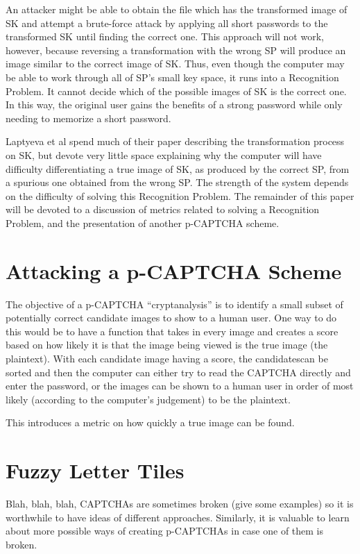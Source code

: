 \documentclass[12pt]{article}
\begin{document}
	An attacker might be able to obtain the file which has the transformed image of SK and attempt a brute-force attack by applying all short passwords to the transformed SK until finding the correct one. This approach will not work, however, because reversing a transformation with the wrong SP will produce an image similar to the correct image of SK. Thus, even though the computer may be able to work through all of SP's small key space, it runs into a Recognition Problem. It cannot decide which of the possible images of SK is the correct one. In this way, the original user gains the benefits of a strong password while only needing to memorize a short password.

	 Laptyeva et al spend much of their paper describing the transformation process on SK, but devote very little space explaining why the computer will have difficulty differentiating a true image of SK, as produced by the correct SP, from a spurious one obtained from the wrong SP. The strength of the system depends on the difficulty of solving this Recognition Problem. The remainder of this paper will be devoted to a discussion of metrics related to solving a Recognition Problem, and the presentation of another p-CAPTCHA scheme.

\section*{Attacking a p-CAPTCHA Scheme}
	The objective of a p-CAPTCHA “cryptanalysis” is to identify a small subset of potentially correct candidate images to show to a human user. One way to do this would be to have a function that takes in every image and creates a score based on how likely it is that the image being viewed is the true image (the plaintext). With each candidate image having a score, the candidatescan be sorted and then the computer can either try to read the CAPTCHA directly and enter the password, or the images can be shown to a human user in order of  most likely (according to the computer's judgement) to be the plaintext.

    This introduces a metric on how quickly a true image can be found.

\section*{Fuzzy Letter Tiles}

Blah, blah, blah, CAPTCHAs are sometimes broken (give some examples) so it is worthwhile to have ideas of different approaches. Similarly, it is valuable to learn about more possible ways of creating p-CAPTCHAs in case one of them is broken.
\end{document}

